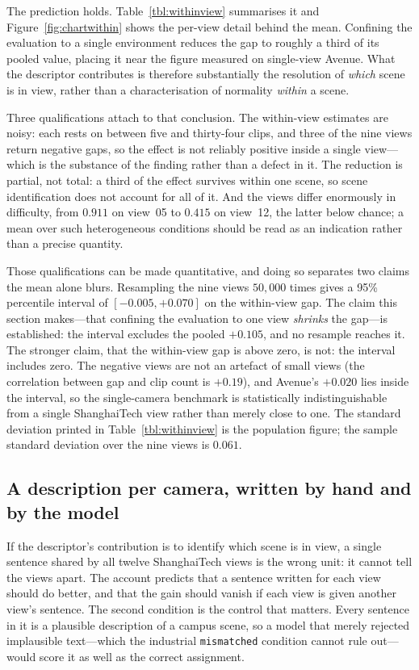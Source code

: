 \documentclass[a4paper,fleqn]{cas-sc}
\begin{document}
The prediction holds. Table~\ref{tbl:withinview} summarises it and
Figure~\ref{fig:chartwithin} shows the per-view detail behind the mean.
Confining the evaluation to a single environment reduces
the gap to roughly a third of its pooled value, placing it near the figure
measured on single-view Avenue. What the descriptor contributes is therefore
substantially the resolution of \emph{which} scene is in view, rather than a
characterisation of normality \emph{within} a scene.

Three qualifications attach to that conclusion. The within-view estimates are
noisy: each rests on between five and thirty-four clips, and three of the nine
views return negative gaps, so the effect is not reliably positive inside a
single view---which is the substance of the finding rather than a defect in it.
The reduction is partial, not total: a third of the effect survives within one
scene, so scene identification does not account for all of it. And the views
differ enormously in difficulty, from $0.911$ on view~05 to $0.415$ on view~12,
the latter below chance; a mean over such heterogeneous conditions should be
read as an indication rather than a precise quantity.

Those qualifications can be made quantitative, and doing so separates two claims
the mean alone blurs. Resampling the nine views $50{,}000$ times gives a 95\%
percentile interval of $[-0.005, +0.070]$ on the within-view gap. The claim this
section makes---that confining the evaluation to one view \emph{shrinks} the
gap---is established: the interval excludes the pooled $+0.105$, and no
resample reaches it. The stronger claim, that the within-view gap is above zero,
is not: the interval includes zero. The negative views are not an artefact of
small views (the correlation between gap and clip count is $+0.19$), and
Avenue's $+0.020$ lies inside the interval, so the single-camera benchmark is
statistically indistinguishable from a single ShanghaiTech view rather than
merely close to one. The standard deviation printed in
Table~\ref{tbl:withinview} is the population figure; the sample standard
deviation over the nine views is $0.061$.

\subsection{A description per camera, written by hand and by the model}
\label{sec:res-perview}
If the descriptor's contribution is to identify which scene is in view, a single
sentence shared by all twelve ShanghaiTech views is the wrong unit: it cannot
tell the views apart. The account predicts that a sentence written for each view
should do better, and that the gain should vanish if each view is given another
view's sentence. The second condition is the control that matters. Every
sentence in it is a plausible description of a campus scene, so a model that
merely rejected implausible text---which the industrial \texttt{mismatched}
condition cannot rule out---would score it as well as the correct assignment.
\end{document}
